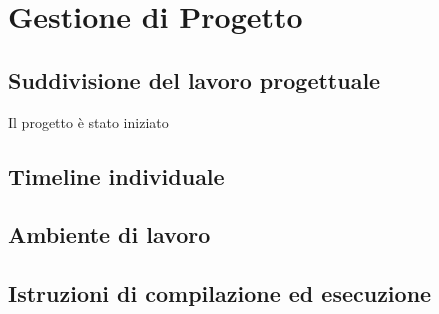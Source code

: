 \section{Gestione di Progetto}

\subsection{Suddivisione del lavoro progettuale}
Il progetto è stato iniziato

\subsection{Timeline individuale}

\subsection{Ambiente di lavoro}

\subsection{Istruzioni di compilazione ed esecuzione}

